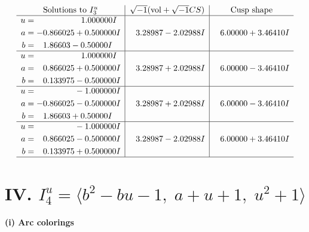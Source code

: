 \documentclass[1p]{elsarticle_modified}
\theoremstyle{definition}
\newcommand{\I}{\sqrt{-1}}
\begin{document}
$$\begin{array}{c|c|c}  
\text{Solutions to }I^u_{3}& \I (\text{vol} + \sqrt{-1}CS) & \text{Cusp shape}\\
 \hline 
\begin{aligned}
u &= \phantom{-0.000000 -}1.000000 I \\
a &= -0.866025 + 0.500000 I \\
b &= \phantom{-}1.86603 - 0.50000 I\end{aligned}
 & \phantom{-}3.28987 - 2.02988 I & \phantom{-}6.00000 + 3.46410 I \\ \hline\begin{aligned}
u &= \phantom{-0.000000 -}1.000000 I \\
a &= \phantom{-}0.866025 + 0.500000 I \\
b &= \phantom{-}0.133975 - 0.500000 I\end{aligned}
 & \phantom{-}3.28987 + 2.02988 I & \phantom{-}6.00000 - 3.46410 I \\ \hline\begin{aligned}
u &= \phantom{-0.000000 } -1.000000 I \\
a &= -0.866025 - 0.500000 I \\
b &= \phantom{-}1.86603 + 0.50000 I\end{aligned}
 & \phantom{-}3.28987 + 2.02988 I & \phantom{-}6.00000 - 3.46410 I \\ \hline\begin{aligned}
u &= \phantom{-0.000000 } -1.000000 I \\
a &= \phantom{-}0.866025 - 0.500000 I \\
b &= \phantom{-}0.133975 + 0.500000 I\end{aligned}
 & \phantom{-}3.28987 - 2.02988 I & \phantom{-}6.00000 + 3.46410 I\\
 \hline 
 \end{array}$$\newpage\newpage\renewcommand{\arraystretch}{1}
\centering \section*{IV. $I^u_{4}= \langle b^2- b u-1,\;a+u+1,\;u^2+1 \rangle$}
\flushleft \textbf{(i) Arc colorings}\\
\end{document}
